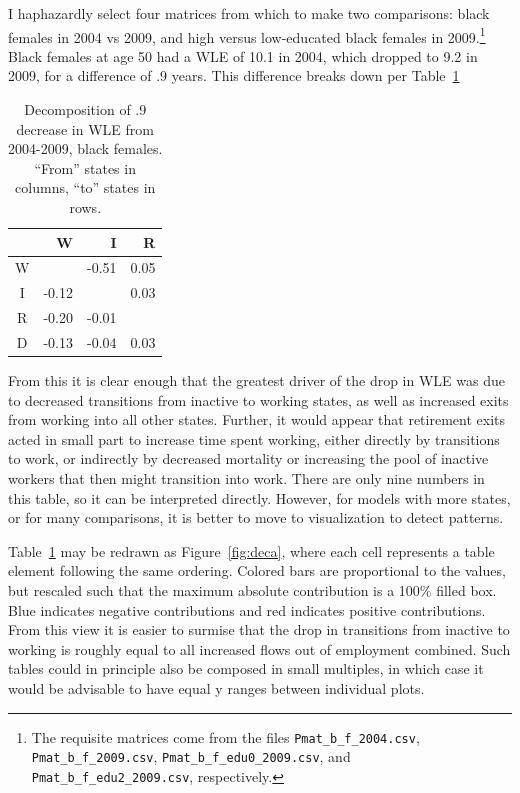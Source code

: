 \documentclass[12pt]{article}
\begin{document}
I haphazardly select four matrices from which to make two comparisons: black
females in 2004 vs 2009, and high versus low-educated black females in
2009.\footnote{The requisite matrices come from the files
\texttt{Pmat\_b\_f\_2004.csv}, \texttt{Pmat\_b\_f\_2009.csv}, \texttt{Pmat\_b\_f\_edu0\_2009.csv}, and
\texttt{Pmat\_b\_f\_edu2\_2009.csv}, respectively. } Black females at age 50 had
a WLE of 10.1 in 2004, which dropped to 9.2 in 2009, for a difference of .9
years. This difference breaks down per Table~\ref{tab:A}
\FloatBarrier
\begin{table}[ht]
\centering
\caption{Decomposition of .9 decrease in WLE from 2004-2009, black females.
``From'' states in columns, ``to'' states in rows.}
\label{tab:A}
\begin{tabular}{c|rrr}
 & W & I & R \\ 
  \hline
W &  & -0.51 & 0.05 \\ 
  I & -0.12 &  & 0.03 \\ 
  R & -0.20 & -0.01 &  \\ 
  D & -0.13 & -0.04 & 0.03 \\ 
   \hline
\end{tabular}
\end{table}

From this it is clear enough that the greatest driver of the drop in WLE was due
to decreased transitions from inactive to working states, as well as increased
exits from working into all other states. Further, it would appear that
retirement exits acted in small part to increase time spent working, either
directly by transitions to work, or indirectly by decreased mortality or increasing the pool
of inactive workers that then might transition into work. There are only nine
numbers in this table, so it can be interpreted directly. However, for models
with more states, or for many comparisons, it is better to move to visualization
to detect patterns. 

Table~\ref{tab:A} may be redrawn as Figure~\ref{fig:deca}, where each cell
represents a table element following the same ordering. Colored bars are
proportional to the values, but rescaled such that the maximum absolute
contribution is a 100\% filled box. Blue indicates negative contributions and
red indicates positive contributions. From this view it is easier to surmise
that the drop in transitions from inactive to working is roughly equal to all
increased flows out of employment combined. Such tables could in principle also
be composed in small multiples, in which case it would be advisable to have
equal y ranges between individual plots.
\end{document}
